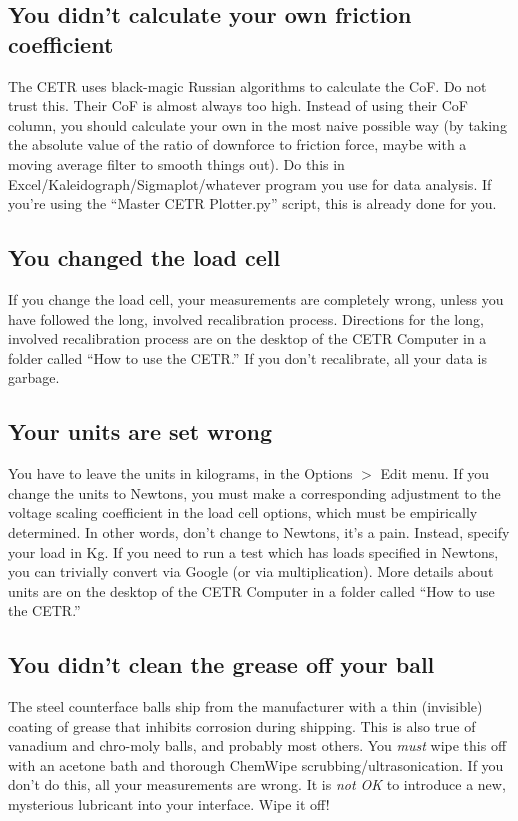 \documentclass[10pt, letterpaper]{article}
\begin{document}
\subsection{You didn't calculate your own friction coefficient}
The CETR uses black-magic Russian algorithms to calculate the CoF. Do not trust this. Their CoF is almost always too high. Instead of using their CoF column, you should calculate your own in the most naive possible way (by taking the absolute value of the ratio of downforce to friction force, maybe with a moving average filter to smooth things out). Do this in Excel/Kaleidograph/Sigmaplot/whatever program you use for data analysis. If you're using the ``Master CETR Plotter.py'' script, this is already done for you.

\subsection{You changed the load cell}
If you change the load cell, your measurements are completely wrong, unless you have followed the long, involved recalibration process. Directions for the long, involved recalibration process are on the desktop of the CETR Computer in a folder called ``How to use the CETR.'' If you don't recalibrate, all your data is garbage.

\subsection{Your units are set wrong}
You have to leave the units in kilograms, in the Options $>$ Edit menu. If you change the units to Newtons, you must make a corresponding adjustment to the voltage scaling coefficient in the load cell options, which must be empirically determined. In other words, don't change to Newtons, it's a pain. Instead, specify your load in Kg. If you need to run a test which has loads specified in Newtons, you can trivially convert via Google (or via multiplication). More details about units are on the desktop of the CETR Computer in a folder called ``How to use the CETR.''

\subsection{You didn't clean the grease off your ball}
The steel counterface balls ship from the manufacturer with a thin (invisible) coating of grease that inhibits corrosion during shipping. This is also true of vanadium and chro-moly balls, and probably most others. You \emph{must} wipe this off with an acetone bath and thorough ChemWipe scrubbing/ultrasonication. If you don't do this, all your measurements are wrong. It is \emph{not OK} to introduce a new, mysterious lubricant into your interface. Wipe it off!
\end{document}
